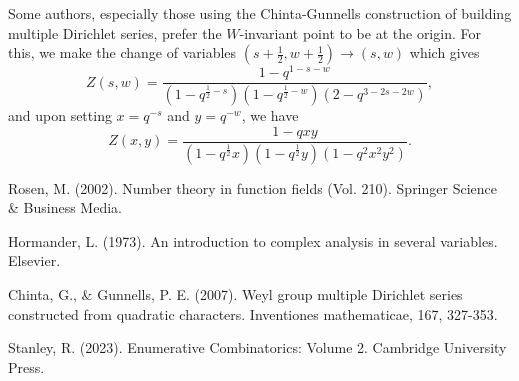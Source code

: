 \documentclass[12pt,reqno,oneside]{amsart}
\begin{document}
    \begin{remark}
        Some authors, especially those using the Chinta-Gunnells construction of building multiple Dirichlet series, prefer the $W$-invariant point to be at the origin. For this, we make the change of variables $\left(s+\frac{1}{2},w+\frac{1}{2}\right) \to (s,w)$ which gives
        \[
            Z(s,w) = \frac{1-q^{1-s-w}}{(1-q^{\frac{1}{2}-s})(1-q^{\frac{1}{2}-w})(2-q^{3-2s-2w})},
        \]
         and upon setting $x = q^{-s}$ and $y = q^{-w}$, we have
        \[
            Z(x,y) = \frac{1-qxy}{(1-q^{\frac{1}{2}}x)(1-q^{\frac{1}{2}}y)(1-q^{2}x^{2}y^{2})}.
        \]
    \end{remark}

\begin{thebibliography}{99}
    Rosen, M. (2002). Number theory in function fields (Vol. 210). Springer Science \& Business Media.

    Hormander, L. (1973). An introduction to complex analysis in several variables. Elsevier.

    Chinta, G., \& Gunnells, P. E. (2007). Weyl group multiple Dirichlet series constructed from quadratic characters. Inventiones mathematicae, 167, 327-353.

    Stanley, R. (2023). Enumerative Combinatorics: Volume 2. Cambridge University Press.
\end{thebibliography}
\end{document}
